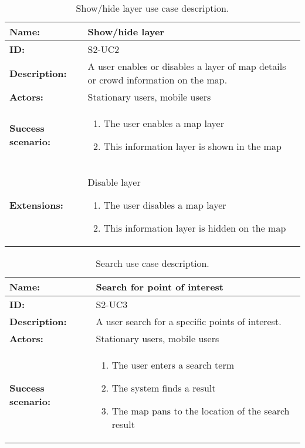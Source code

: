 \begin{table}[h!]
    \centering
    \begin{tabularx}{\textwidth}{lX}
        \toprule
        \textbf{Name:}  & Show/hide layer \\ \midrule
        \textbf{ID:}    & S2-UC2 \\ \midrule
        \textbf{Description:} & A user enables or disables a layer of map details or crowd information on the map. \\ \midrule
        \textbf{Actors:} & Stationary users, mobile users \\ \midrule
        \textbf{Success scenario:} & 
        \begin{enumerate}
            \item The user enables a map layer
            \item This information layer is shown in the map
        \end{enumerate}
        \\ \midrule
        \textbf{Extensions:} & Disable layer 
        \begin{enumerate}
            \item The user disables a map layer
            \item This information layer is hidden on the map
        \end{enumerate}
        \\ \bottomrule
    \end{tabularx}
    \caption{Show/hide layer use case description.}
    \label{tab:s2-uc2}
\end{table}

\begin{table}[h!]
    \centering
    \begin{tabularx}{\textwidth}{lX}
        \toprule
        \textbf{Name:}  & Search for point of interest \\ \midrule
        \textbf{ID:}    & S2-UC3 \\ \midrule
        \textbf{Description:} & A user search for a specific points of interest. \\ \midrule
        \textbf{Actors:} & Stationary users, mobile users \\ \midrule
        \textbf{Success scenario:} & 
        \begin{enumerate}
            \item The user enters a search term
            \item The system finds a result
            \item The map pans to the location of the search result
        \end{enumerate}
        \\ \bottomrule
    \end{tabularx}
    \caption{Search use case description.}
    \label{tab:s2-uc3}
\end{table}

